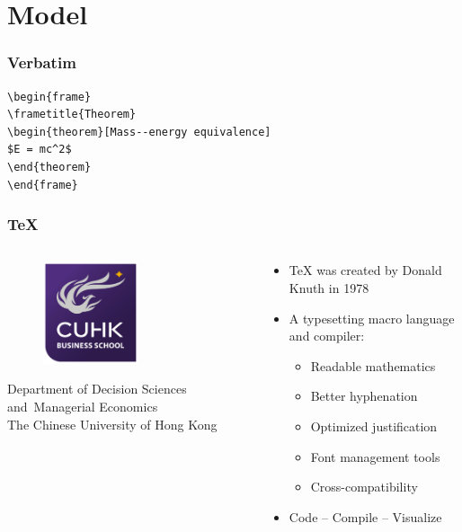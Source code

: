 \documentclass[10pt,aspectratio=32]{beamer}
\begin{document}
 
 
\section{Model}


\begin{frame}[fragile] %
\frametitle{Verbatim}
\begin{example}
\begin{verbatim}
\begin{frame}
\frametitle{Theorem}
\begin{theorem}[Mass--energy equivalence]
$E = mc^2$
\end{theorem}
\end{frame}\end{verbatim}
\end{example}
\end{frame}
 
 
\begin{frame}
	\frametitle{\TeX{}}
	\begin{columns}
		\begin{column}{4cm}
			\begin{figure}
				\includegraphics[height=3cm]{cuba_logo}
			\end{figure}
			\begin{center}
				\tiny
				Department of Decision Sciences and\
				Managerial Economics \\
				The Chinese University of Hong Kong \\
			\end{center}
		\end{column}
		\begin{column}{6cm}
			\begin{itemize}
				\item \TeX{} was created by Donald Knuth in 1978
				\item A typesetting macro language and compiler:
				\begin{itemize}
					\item Readable mathematics
					\item Better hyphenation
					\item Optimized justification
					\item Font management tools
					\item Cross-compatibility
				\end{itemize}
				\item Code -- Compile -- Visualize
			\end{itemize}
		\end{column}
	\end{columns}
\end{frame}
 
\end{document}
